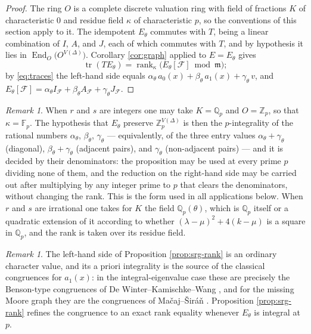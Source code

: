 \documentclass[11pt]{article}
\theoremstyle{plain}
\theoremstyle{remark}
\newtheorem{remark}[theorem]{Remark}
\newcommand{\tr}{\operatorname{tr}}
\newcommand{\rank}{\operatorname{rank}}
\newcommand{\Zp}{\mathbb Z_p}
\newcommand{\Qp}{\mathbb Q_p}
\newcommand{\Fp}{\mathbb F_p}
\begin{document}
\begin{proof}
The ring $O$ is a complete discrete valuation ring with field of fractions $K$ of characteristic $0$ and residue field $\kappa$ of characteristic $p$,
so the conventions of this section apply to it.
The idempotent $E_\theta$ commutes with $T$, being a linear combination of $I$, $A$, and $J$,
each of which commutes with $T$, and by hypothesis it lies in $\operatorname{End}_O\bigl(O^{V(\Delta)}\bigr)$.
Corollary \ref{cor:graph} applied to $E=E_\theta$ gives
\[
 \tr(TE_\theta)=\rank_\kappa\bigl(E_\theta[\mathcal F]\bmod\mathfrak m\bigr);
\]
by \eqref{eq:traces} the left-hand side equals $\alpha_\theta\,a_0(x)+\beta_\theta\,a_1(x)+\gamma_\theta\,v$,
and $E_\theta[\mathcal F]=\alpha_\theta I_{\mathcal F}+\beta_\theta A_{\mathcal F}+\gamma_\theta J_{\mathcal F}$.
\end{proof}

\begin{remark}\label{rem:integral}
When $r$ and $s$ are integers one may take $K=\Qp$ and $O=\Zp$, so that $\kappa=\Fp$.
The hypothesis that $E_\theta$ preserve $\Zp^{V(\Delta)}$ is then the $p$-integrality of the rational numbers $\alpha_\theta$,
$\beta_\theta$, $\gamma_\theta$ --- equivalently, of the three entry values $\alpha_\theta+\gamma_\theta$ (diagonal),
$\beta_\theta+\gamma_\theta$ (adjacent pairs),
and $\gamma_\theta$ (non-adjacent pairs) --- and it is decided by their denominators: the proposition may be used at every prime $p$ dividing none of them,
and the reduction on the right-hand side may be carried out after multiplying by any integer prime to $p$ that clears the denominators,
without changing the rank.
This is the form used in all applications below.
When $r$ and $s$ are irrational one takes for $K$ the field $\Qp(\theta)$,
which is $\Qp$ itself or a quadratic extension of it according to whether $(\lambda-\mu)^2+4(k-\mu)$ is a square in $\Qp$,
and the rank is taken over its residue field.
\end{remark}

\begin{remark}\label{rem:benson}
The left-hand side of Proposition \ref{prop:srg-rank} is an ordinary character value,
and its a priori integrality is the source of the classical congruences for $a_1(x)$:
in the integral-eigenvalue case these are precisely the Benson-type congruences of De Winter--Kamischke--Wang \cite[Theorem 1]{DeWinterKamischkeWang},
and for the missing Moore graph they are the congruences of Ma\v{c}aj--\v{S}ir\'a\v{n} \cite[Lemma 3]{MacajSiran}.
Proposition \ref{prop:srg-rank} refines the congruence to an exact rank equality whenever $E_\theta$ is integral at $p$.
\end{remark}
\end{document}
